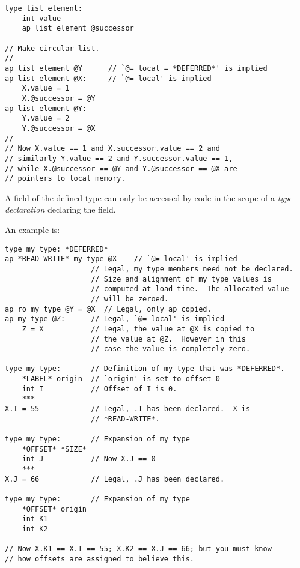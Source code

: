 \documentclass[12pt]{article}
\newenvironment{indpar}[1][0.3in]%
	{\begin{list}{}%
		     {\setlength{\itemsep}{0in}%
		      \setlength{\topsep}{0in}%
		      \setlength{\parsep}{1ex}%
		      \setlength{\labelwidth}{#1}%
		      \setlength{\leftmargin}{#1}%
		      \addtolength{\leftmargin}{\labelsep}}%
	 \item}%
	{\end{list}}
\begin{document}
\begin{indpar}\begin{verbatim}
type list element:
    int value
    ap list element @successor

// Make circular list.
//
ap list element @Y      // `@= local = *DEFERRED*' is implied
ap list element @X:     // `@= local' is implied
    X.value = 1
    X.@successor = @Y
ap list element @Y:
    Y.value = 2
    Y.@successor = @X
//
// Now X.value == 1 and X.successor.value == 2 and
// similarly Y.value == 2 and Y.successor.value == 1,
// while X.@successor == @Y and Y.@successor == @X are
// pointers to local memory.
\end{verbatim}\end{indpar}

A field of
the defined type can only be accessed by code in the scope
of a {\em type-declaration} declaring the field.

An example is:

\begin{indpar}\begin{verbatim}
type my type: *DEFERRED*
ap *READ-WRITE* my type @X    // `@= local' is implied
                    // Legal, my type members need not be declared.
                    // Size and alignment of my type values is
                    // computed at load time.  The allocated value
                    // will be zeroed.
ap ro my type @Y = @X  // Legal, only ap copied.
ap my type @Z:      // Legal, `@= local' is implied
    Z = X           // Legal, the value at @X is copied to
                    // the value at @Z.  However in this
                    // case the value is completely zero.

type my type:       // Definition of my type that was *DEFERRED*.
    *LABEL* origin  // `origin' is set to offset 0
    int I           // Offset of I is 0.
    ***
X.I = 55            // Legal, .I has been declared.  X is
                    // *READ-WRITE*.

type my type:       // Expansion of my type
    *OFFSET* *SIZE*
    int J           // Now X.J == 0
    ***
X.J = 66            // Legal, .J has been declared.

type my type:       // Expansion of my type
    *OFFSET* origin
    int K1
    int K2

// Now X.K1 == X.I == 55; X.K2 == X.J == 66; but you must know
// how offsets are assigned to believe this.
\end{verbatim}\end{indpar}
\end{document}
